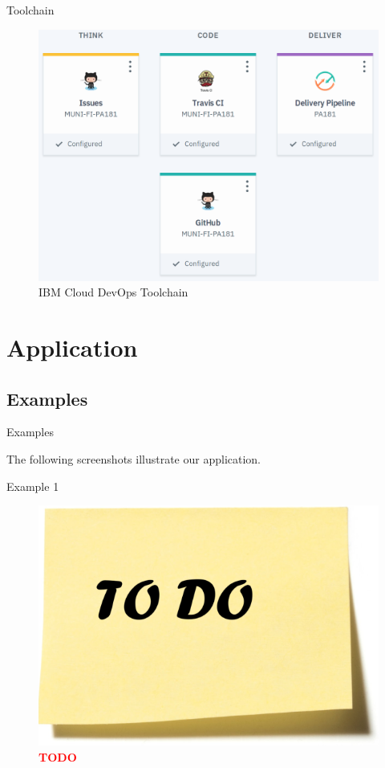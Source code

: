 \documentclass[]{beamer}
\newcommand{\TODO}{\textbf{\textcolor{red}{TODO}}} %
\begin{document}
    \begin{frame}{Toolchain}
      \begin{figure}[H]
        \includegraphics[width=.75\textwidth,height=.75\textheight,keepaspectratio]{img/toolchain.png}
        \caption{IBM Cloud DevOps Toolchain}
      \end{figure}
    \end{frame}

\section[Application]{Application}

  \subsection{Examples}

    \begin{frame}{Examples}
      \vspace{7.5mm}
      \centerline{The following screenshots illustrate our application.}
    \end{frame}

    \begin{frame}{Example 1}
      \begin{figure}
        \includegraphics[width=.5\textwidth,height=.5\textheight,keepaspectratio]{img/todo.png}
        \caption{\TODO}
      \end{figure}
    \end{frame}
\end{document}
